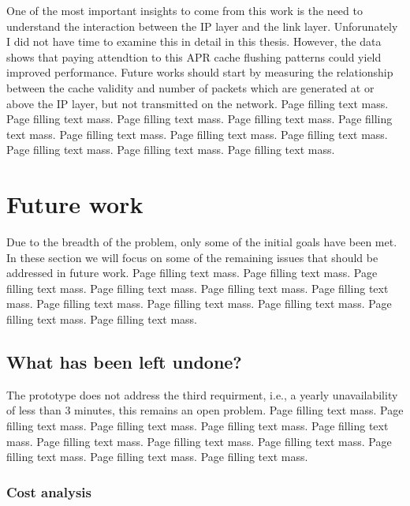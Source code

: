 \documentclass[12pt,a4paper,twoside,openright]{book}
\begin{document}
One of the most important insights to come from this work is the need to
understand the interaction between the IP layer and the link
layer. Unforunately I did not have time to examine this in detail in this
thesis. However, the data shows that paying attendtion to this APR cache
flushing patterns could yield improved performance. Future works should start
by measuring the relationship between the cache validity and number of packets
which are generated at or above the IP layer, but not transmitted on the
network.  Page filling text mass. Page filling text mass. Page filling text
mass. Page filling text mass. Page filling text mass. Page filling text
mass. Page filling text mass. Page filling text mass. Page filling text
mass. Page filling text mass. Page filling text mass.

\section{Future work}
\label{sec:future-work}


Due to the breadth of the problem, only some of the initial goals have been
met. In these section we will focus on some of the remaining issues that
should be addressed in future work. Page filling text mass. Page filling text
mass. Page filling text mass. Page filling text mass. Page filling text
mass. Page filling text mass. Page filling text mass. Page filling text
mass. Page filling text mass. Page filling text mass. Page filling text mass.

\subsection{What has been left undone?}
\label{what-has-been-left-undone}

The prototype does not address the third requirment, i.e., a yearly
unavailability of less than 3 minutes, this remains an open problem.  Page
filling text mass. Page filling text mass. Page filling text mass. Page
filling text mass. Page filling text mass. Page filling text mass. Page
filling text mass. Page filling text mass. Page filling text mass. Page
filling text mass. Page filling text mass.

\subsubsection{Cost analysis}
\end{document}
